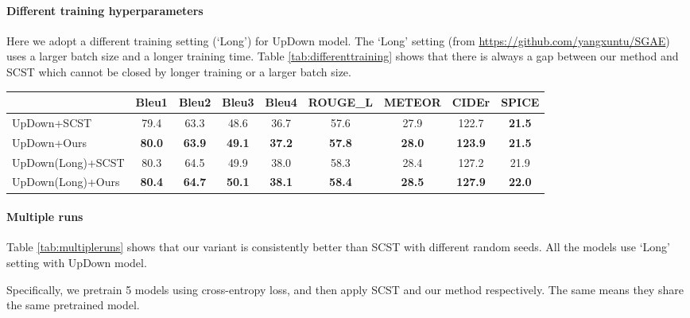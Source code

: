 \documentclass[11pt,a4paper]{article}
\begin{document}
\paragraph{Different training hyperparameters}
Here we adopt a different training setting (`Long') for UpDown model. The `Long' setting (from \url{https://github.com/yangxuntu/SGAE}) uses a larger batch size and a longer training time. Table \ref{tab:differenttraining} shows that there is always a gap between our method and SCST which cannot be closed by longer training or a larger batch size.
\begin{table*}[htbp]\small
  \centering
    \begin{tabular}{lcccccccc}
          & \multicolumn{1}{c}{Bleu1} & \multicolumn{1}{c}{Bleu2} & \multicolumn{1}{c}{Bleu3} & \multicolumn{1}{c}{Bleu4} & \multicolumn{1}{c}{ROUGE\_L} & \multicolumn{1}{c}{METEOR} & \multicolumn{1}{c}{CIDEr} & \multicolumn{1}{c}{SPICE} \\
    \midrule
    UpDown+SCST & 79.4  & 63.3  & 48.6  & 36.7  & 57.6  & 27.9  & 122.7 & \textbf{21.5} \\
    UpDown+Ours & \textbf{80.0} & \textbf{63.9} & \textbf{49.1} & \textbf{37.2} & \textbf{57.8} & \textbf{28.0} & \textbf{123.9} & \textbf{21.5} \\
    \midrule
    UpDown(Long)+SCST & 80.3  & 64.5  & 49.9  & 38.0  & 58.3  & 28.4  & 127.2 & 21.9 \\
    UpDown(Long)+Ours & \textbf{80.4} & \textbf{64.7} & \textbf{50.1} & \textbf{38.1} & \textbf{58.4} & \textbf{28.5} & \textbf{127.9} & \textbf{22.0} \\
    \bottomrule
    \end{tabular}\caption{The performance of UpDown model with SCST/Ours under two different hyperparameter settings.}
  \label{tab:differenttraining}\end{table*}


\paragraph{Multiple runs}
Table \ref{tab:multipleruns} shows that our variant is consistently better than SCST with different random seeds. All the models use `Long' setting with UpDown model.

Specifically, we pretrain 5 models using cross-entropy loss, and then apply SCST and our method respectively. The same  means they share the same pretrained model.
\end{document}
